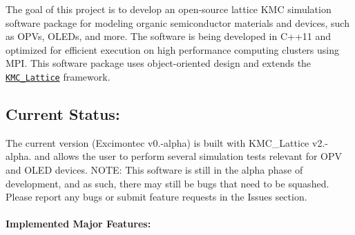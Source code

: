 The goal of this project is to develop an open-\/source lattice K\+MC simulation software package for modeling organic semiconductor materials and devices, such as O\+P\+Vs, O\+L\+E\+Ds, and more. The software is being developed in C++11 and optimized for efficient execution on high performance computing clusters using M\+PI. This software package uses object-\/oriented design and extends the \href{https://github.com/MikeHeiber/KMC_Lattice}{\tt K\+M\+C\+\_\+\+Lattice} framework.

\subsection*{Current Status\+:}

The current version (Excimontec v0.-\/alpha) is built with K\+M\+C\+\_\+\+Lattice v2.-\/alpha. and allows the user to perform several simulation tests relevant for O\+PV and O\+L\+ED devices. N\+O\+TE\+: This software is still in the alpha phase of development, and as such, there may still be bugs that need to be squashed. Please report any bugs or submit feature requests in the Issues section.

\paragraph*{Implemented Major Features\+:}


